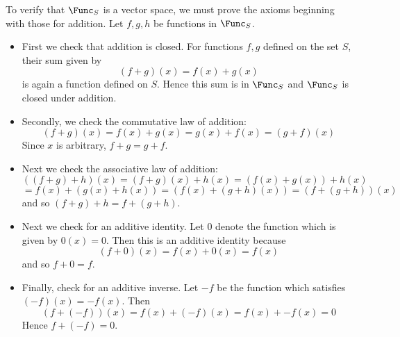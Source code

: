 \begin{solution}
To verify that $\Func_S$ is a vector space, we must prove the axioms beginning with those for addition. Let $f, g, h$ be functions in $\Func_S$. 

\begin{itemize}
\item
First we check that addition is closed.  For functions $f, g$ defined on the set $S$, their sum given by 
\[
(f+g)(x) = f(x)+g(x)
\]
is again a function defined on $S$. Hence this sum is in $\Func_S$ and $\Func_S$ is closed under addition. 

\item
Secondly, we check the commutative law of addition:
\begin{equation*}
\left( f+g\right) \left( x\right) =f\left( x\right) +g\left( x\right)
=g\left( x\right) +f\left( x\right) =\left( g+f\right) \left( x\right)
\end{equation*}
Since $x$ is arbitrary, $f+g=g+f$.

\item
Next we check the associative law of addition:
\begin{equation*}
\left( \left( f+g\right) +h\right) \left( x\right) = \left( f+g\right)
\left( x\right) +h\left( x\right) =\left( f\left( x\right) +g\left( x\right)
\right) +h\left( x\right)
\end{equation*}
\begin{equation*}
=f\left( x\right) +\left( g\left( x\right) +h\left( x\right) \right) =\left(
f\left( x\right) +\left( g+h\right) \left( x\right) \right) =\left( f+\left(
g+h\right) \right) \left( x\right)
\end{equation*}
and so $\left( f+g\right) +h=f+\left( g+h\right) .$

\item
Next we check for an additive identity.  Let $0$ denote the
function which is given by $0\left( x\right) =0.$ Then this is an additive
identity because 
\begin{equation*}
\left( f+0\right) \left( x\right) =f\left( x\right) +0\left( x\right)
=f\left( x\right)
\end{equation*}
and so $f+0=f$. 

\item
Finally, check for an additive inverse. Let $-f$ be the function which satisfies $\left( -f\right)
\left( x\right) = -f\left( x\right) .$ Then 
\begin{equation*}
\left( f+\left( -f\right) \right) \left( x\right) = f\left( x\right)
+\left( -f\right) \left( x\right) = f\left( x\right) +-f\left( x\right)
=0
\end{equation*}
Hence $f+\left( -f\right) =0$. 
\end{itemize}


\end{solution}
